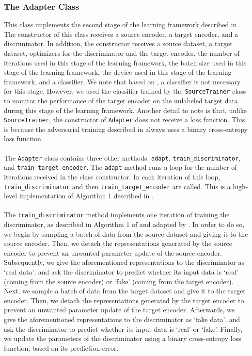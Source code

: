 \documentclass[14pt]{extarticle}
\begin{document}
		\subsubsection{The Adapter Class}
		This class implements the second stage of the learning framework described in \cite{adda}. The constructor of this class receives a source encoder, a target encoder, and a discriminator. In addition, the constructor receives a source dataset, a target dataset, optimizers for the discriminator and the target encoder, the number of iterations used in this stage of the learning framework, the batch size used in this stage of the learning framework, the device used in this stage of the learning framework, and a classifier. We note that based on \cite{adda}, a classifier is not necessary for this stage. However, we used the classifier trained by the \texttt{SourceTrainer} class to monitor the performance of the target encoder on the unlabeled target data during this stage of the learning framework. Another detail to note is that, unlike \texttt{SourceTrainer}, the constructor of \texttt{Adapter} does not receive a loss function. This is because the adversarial training described in \cite{adda} always uses a binary cross-entropy loss function.\\\\
		The \texttt{Adapter} class contains three other methods: \texttt{adapt}, \texttt{train\_discriminator}, and \texttt{train\_target\_encoder}. The \texttt{adapt} method runs a loop for the number of iterations received in the class constructor. In each iteration of this loop, \texttt{train\_discriminator} and then \texttt{train\_target\_encoder} are called. This is a high-level implementation of Algorithm 1 described in \cite{gan}.\\\\
		The \texttt{train\_discriminator} method implements one iteration of training the discriminator, as described in Algorithm 1 of \cite{gan} and adapted by \cite{adda}. In order to do so, we begin by sampling a batch of data from the source dataset and giving it to the source encoder. Then, we detach the representations generated by the source encoder to prevent an unwanted parameter update of the source encoder. Subsequently, we give the aforementioned representations to the discriminator as `real data', and ask the discriminator to predict whether its input data is `real' (coming from the source encoder) or `fake' (coming from the target encoder). Next, we sample a batch of data from the target dataset and give it to the target encoder. Then, we detach the representations generated by the target encoder to prevent an unwanted parameter update of the target encoder. Afterwards, we give the aforementioned representations to the discriminator as `fake data', and ask the discriminator to predict whether its input data is `real' or `fake'. Finally, we update the parameters of the discriminator using a binary cross-entropy loss function, based on its prediction error.\\\\
\end{document}
